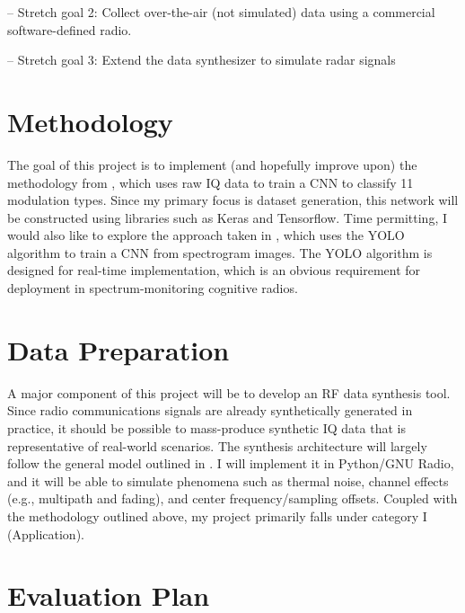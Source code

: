 \documentclass{article}
\begin{document}
-- Stretch goal 2: Collect over-the-air (not simulated) data using a commercial software-defined radio.

-- Stretch goal 3: Extend the data synthesizer to simulate radar signals

\section{Methodology}
The goal of this project is to implement (and hopefully improve upon)
the methodology from \cite{OShea2016a}, which uses raw IQ data to train a
CNN to classify 11 modulation types. Since my primary focus is dataset
generation, this network will be constructed using libraries such as Keras and
Tensorflow. Time permitting, I would also like to explore the approach taken
in \cite{Vagollari2021}, which uses the YOLO algorithm \cite{Redmon2016} to
train a CNN from spectrogram images. The YOLO algorithm is designed for
real-time implementation, which is an obvious requirement for deployment in
spectrum-monitoring cognitive radios.

\section{Data Preparation}
A major component of this project will be to develop an RF data
synthesis tool. Since radio communications signals are already synthetically generated in
practice, it should be possible to
mass-produce synthetic IQ data that is representative of real-world scenarios.
The synthesis architecture will largely follow the general model outlined in
\cite{OShea2016}. I will implement it in Python/GNU Radio, and it will be able
to simulate phenomena such as thermal noise, channel effects (e.g., multipath
and fading), and center frequency/sampling offsets. Coupled with
the methodology outlined above, my project primarily falls under category I (Application).

\section{Evaluation Plan}




\end{document}
